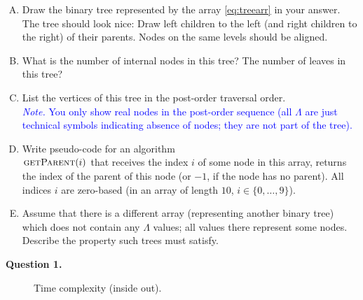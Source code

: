\documentclass[a4paper,12pt]{article}
\begin{document}
\begin{enumerate}[(A)]
\item Draw the binary tree represented by the array \ref{eq:treearr} in your answer. 
The tree should look nice: 
Draw left children to the left (and right children to the right)
of their parents. Nodes on the same levels should be aligned. 
\item What is the number of internal nodes in this tree? The number of leaves in this tree?
\item List the vertices of this tree in the post-order traversal order.\\
\textcolor{blue}{\footnotesize
{\em Note.} You only show real nodes in the post-order sequence (all $\Lambda$ are 
just technical symbols indicating absence of nodes; they are not part of the tree). 
}
\item Write pseudo-code for an algorithm\\ 
$\text{\textsc{getParent}}(i)$ that receives 
the index $i$ of some node in this array, returns the index of the parent of this node (or $-1$, if the node has no parent). 
All indices $i$ are zero-based (in an array of length $10$, $i \in \{0,\ldots,9\}$).
\item Assume that there is a different array (representing another binary tree) which does not contain any $\Lambda$ 
values; all values there represent some nodes. Describe the property such trees must satisfy.  
\end{enumerate}



\newpage

{\bf Question 1.} 

\begin{figure}[!htb]
\caption{\label{fig:prob3-pseudocode} Time complexity (inside out).}
\end{figure}
\end{document}
